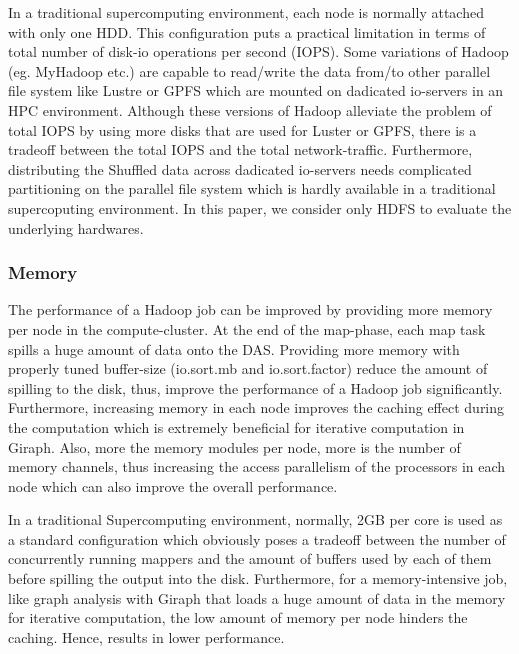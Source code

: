 \documentclass[conference]{IEEEtran}
\begin{document}
In a traditional supercomputing environment, each node is normally attached with only one HDD. 
This configuration puts a practical limitation in terms of total number of disk-io operations per second (IOPS).
Some variations of Hadoop (eg. MyHadoop etc.) are capable to read/write the data from/to other parallel file system like Lustre or GPFS which are mounted on dadicated io-servers in an HPC environment. 
Although these versions of Hadoop alleviate the problem of total IOPS by using more disks that are used for Luster or GPFS, there is a tradeoff between the total IOPS and the total network-traffic.
Furthermore, distributing the Shuffled data across dadicated io-servers needs complicated partitioning on the parallel file system which is hardly available in a traditional supercoputing environment.
In this paper, we consider only HDFS to evaluate the underlying hardwares.

\subsubsection {Memory}
The performance of a Hadoop job can be improved by providing more memory per node in the compute-cluster. 
At the end of the map-phase, each map task spills a huge amount of data onto the DAS. 
Providing more memory with properly tuned buffer-size (io.sort.mb and io.sort.factor) reduce the amount of spilling to the disk, thus, improve the performance of a Hadoop job significantly.
Furthermore, increasing memory in each node improves the caching effect during the computation which is extremely beneficial for iterative computation in Giraph.
Also, more the memory modules per node, more is the number of memory channels, thus increasing the access parallelism of the processors in each node which can also improve the overall performance.

In a traditional Supercomputing environment, normally, 2GB per core is used as a standard configuration which obviously poses a tradeoff between the number of concurrently running mappers and the amount of buffers used by each of them before spilling the output into the disk. 
Furthermore, for a memory-intensive job, like graph analysis with Giraph that loads a huge amount of data in the memory for iterative computation, the low amount of memory per node hinders the caching. Hence, results in lower performance.
\end{document}
